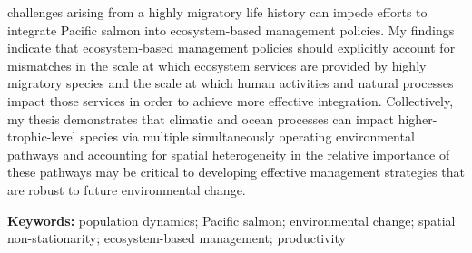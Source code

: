 challenges arising from a highly migratory life history can impede efforts to
integrate Pacific salmon into ecosystem-based management policies. My findings
indicate that ecosystem-based management policies should explicitly account for
mismatches in the scale at which ecosystem services are provided by highly
migratory species and the scale at which human activities and natural processes
impact those services in order to achieve more effective integration.
Collectively, my thesis demonstrates that climatic and ocean processes can
impact higher-trophic-level species via multiple simultaneously operating
environmental pathways and accounting for spatial heterogeneity in the relative
importance of these pathways may be critical to developing effective management
strategies that are robust to future environmental change.

\noindent \textbf{Keywords:} population dynamics; Pacific salmon; environmental
change; spatial non-stationarity; ecosystem-based management; productivity

